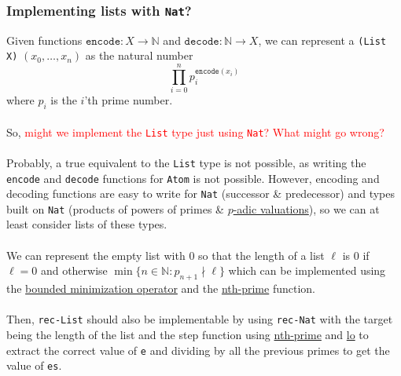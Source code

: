 \documentclass{article}
\newcommand{\ttt}[1]{\texttt{#1}}
\newcommand{\bb}[1]{\mathbb{#1}}
\newcommand{\bN}{\bb{N}}
\begin{document}
\subsubsection{Implementing lists with \ttt{Nat}?}
Given functions \(\ttt{encode} : X \to \bN\) and \(\ttt{decode} : \bN \to X\), we can represent a \ttt{(List X)} \((x_0, \dots, x_n)\) as the natural number \[
    \prod_{i = 0}^n p_i^{\ttt{encode}(x_i)}
\] where \(p_i\) is the \(i\)'th prime number.
\\ \\
So, \textcolor{red}{might we implement the \ttt{List} type just using \ttt{Nat}? What might go wrong?}
\\ \\
Probably, a true equivalent to the \ttt{List} type is not possible, as writing the \ttt{encode} and \ttt{decode} functions for \ttt{Atom} is not possible. However, encoding and decoding functions are easy to write for \ttt{Nat} (successor \& predecessor) and types built on \ttt{Nat} (products of powers of primes \& \hyperref[code:lo]{\(p\)-adic valuations}), so we can at least consider lists of these types.
\\ \\
We can represent the empty list with \(0\) so that the length of a list \(\ell\) is 0 if \(\ell = 0\) and otherwise \(\min \{ n \in \bN : p_{n + 1} \nmid \ell \}\) which can be implemented using the \hyperref[code:mu]{bounded minimization operator} and the \hyperref[code:nth-prime]{nth-prime} function.
\\ \\
Then, \ttt{rec-List} should also be implementable by using \ttt{rec-Nat} with the target being the length of the list and the step function using \hyperref[code:nth-prime]{nth-prime} and \hyperref[code:lo]{lo} to extract the correct value of \ttt{e} and dividing by all the previous primes to get the value of \ttt{es}.
\end{document}
